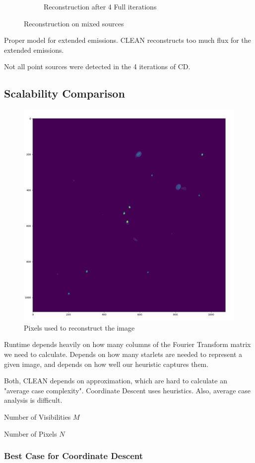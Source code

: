 \begin{figure}[h]
\begin{subfigure}[b]{0.45\linewidth}
		\caption{Reconstruction after 4 Full iterations}
		\label{results:g55:nrao:dirty}
	\end{subfigure}
	\caption{Reconstruction on mixed sources}
	\label{results:mixed}
\end{figure}

Proper model for extended emissions. CLEAN reconstructs too much flux for the extended emissions.

Not all point sources were detected in the 4 iterations of CD.



\subsection{Scalability Comparison}


\begin{figure}[h]
	\centering
	\includegraphics[width=0.5\linewidth]{./chapters/05.algorithms/sim00/full_cache_debug.png}
	\caption{Pixels used to reconstruct the image}
	\label{results:pixels:used}
\end{figure}
Runtime depends heavily on how many columns of the Fourier Transform matrix we need to calculate. Depends on how many starlets are needed to represent a given image, and depends on how well our heuristic captures them. 

Both, CLEAN depends on approximation, which are hard to calculate an "average case complexity". 
Coordinate Descent uses heuristics. Also, average case analysis is difficult. 

Number of Visibilities $M$

Number of Pixels $N$

\subsubsection{Best Case for Coordinate Descent}

